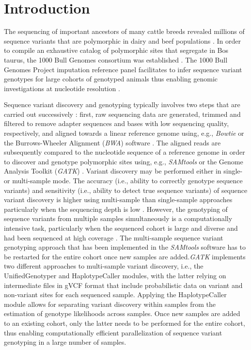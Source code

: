\documentclass[../main.tex]{subfiles}
\begin{document}
\newpage

\section{Introduction}

\doublespacing 
\normalsize
The sequencing of important ancestors of many cattle breeds revealed millions of sequence variants that are polymorphic in dairy and beef populations \citep{Hoff2017,Stothard2015,Boussaha2016,Jansen2013}. In order to compile an exhaustive catalog of polymorphic sites that segregate in Bos taurus, the 1000 Bull Genomes consortium was established \citep{Daetwyler2014,Hayes2019}. 
The 1000 Bull Genomes Project imputation reference panel facilitates to infer sequence variant genotypes for large cohorts of genotyped animals thus enabling genomic investigations at nucleotide resolution \citep{Daetwyler2014,Pausch2017,Bouwman2018,Raymond2018}.

Sequence variant discovery and genotyping typically involves two steps that are carried out successively \citep{nielsen2011genotype,guo2014three,goodwin2016coming,pfeifer2017next}: first, raw sequencing data are generated, trimmed and filtered to remove adapter sequences and bases with low sequencing quality, respectively, and aligned towards a linear reference genome using, e.g., \emph{Bowtie} \citep{langmead2012fast} or the Burrows-Wheeler Alignment (\emph{BWA}) software \citep{li2009fast}. The aligned reads are subsequently compared to the nucleotide sequence of a reference genome in order to discover and genotype polymorphic sites using, e.g., \emph{SAMtools} \citep{li2009sequence} or the Genome Analysis Toolkit (\emph{GATK}) \citep{mckenna2010genome,van2013fastq,poplin2018scaling}. Variant discovery may be performed either in single- or multi-sample mode. The accuracy (i.e., ability to correctly genotype sequence variants) and sensitivity (i.e., ability to detect true sequence variants) of sequence variant discovery is higher using multi-sample than single-sample approaches particularly when the sequencing depth is low \citep{liu2013variant,cheng2014assessing,baes2014evaluation,kumar2014evaluation,depristo2011framework}. However, the genotyping of sequence variants from multiple samples simultaneously is a computationally intensive task, particularly when the sequenced cohort is large and diverse and had been sequenced at high coverage \citep{poplin2018scaling}. The multi-sample sequence variant genotyping approach that has been implemented in the \emph{SAMtools} software has to be restarted for the entire cohort once new samples are added.\emph{GATK} implements two different approaches to multi-sample variant discovery, i.e., the UnifiedGenotyper and HaplotypeCaller modules, with the latter relying on intermediate files in gVCF format that include probabilistic data on variant and non-variant sites for each sequenced sample. Applying the HaplotypeCaller module allows for separating variant discovery within samples from the estimation of genotype likelihoods across samples. Once new samples are added to an existing cohort, only the latter needs to be performed for the entire cohort, thus enabling computationally efficient parallelization of sequence variant genotyping in a large number of samples.  
\end{document}

